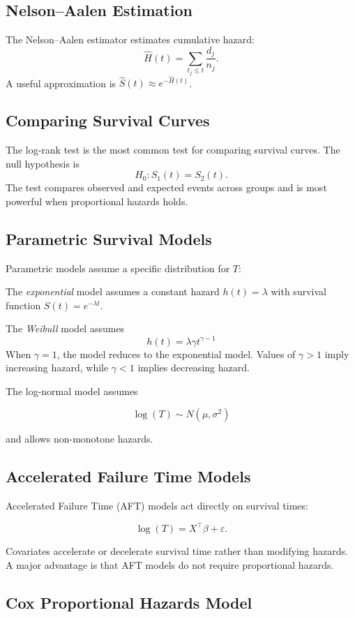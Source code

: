 \documentclass[11pt]{article}
\begin{document}
\subsection*{Nelson--Aalen Estimation}
The Nelson--Aalen estimator estimates cumulative hazard:
\[\hat H(t)=\sum_{t_j\le t}\frac{d_j}{n_j}.\]
A useful approximation is $\hat S(t)\approx e^{-\hat H(t)}$.

\subsection*{Comparing Survival Curves}

The log-rank test is the most common test for comparing survival curves.
The null hypothesis is
\[H_0:S_1(t)=S_2(t).\]
The test compares observed and expected events across groups and is most powerful when proportional hazards holds.

\subsection*{Parametric Survival Models}

Parametric models assume a specific distribution for $T$:

The \emph{exponential} model assumes a constant hazard $h(t)=\lambda$ with survival function $S(t)=e^{-\lambda t}$.

The \emph{Weibull} model assumes $$h(t)=\lambda\gamma t^{\gamma-1}$$
When $\gamma=1$, the model reduces to the exponential model. Values of $\gamma>1$ imply increasing hazard, while $\gamma<1$ implies decreasing hazard.

The log-normal model assumes

\[\log(T)\sim N(\mu,\sigma^2)\]

and allows non-monotone hazards.

\subsection*{Accelerated Failure Time Models}

Accelerated Failure Time (AFT) models act directly on survival times:

\[\log(T)=X^\top\beta+\varepsilon.\]

Covariates accelerate or decelerate survival time rather than modifying hazards.
A major advantage is that AFT models do not require proportional hazards.

\subsection*{Cox Proportional Hazards Model}
\end{document}
